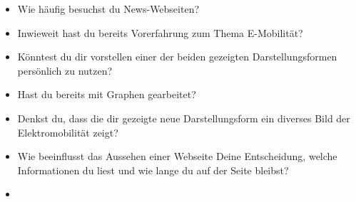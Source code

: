{\begin{itemize}[]
        \item {} Wie häufig besuchst du News-Webseiten?
        \item {} Inwieweit hast du bereits Vorerfahrung zum Thema E-Mobilität?
        \item {} Könntest du dir vorstellen einer der beiden gezeigten Darstellungsformen persönlich zu nutzen?
        \item {} Hast du bereits mit Graphen gearbeitet?
        \item {} Denkst du, dass die dir gezeigte neue Darstellungsform ein diverses Bild der Elektromobilität zeigt?
        \item {} Wie beeinflusst das Aussehen einer Webseite Deine Entscheidung, welche Informationen du liest und wie lange du auf der Seite bleibst?
        \item {}
    \end{itemize}}
\nolinenumbers
